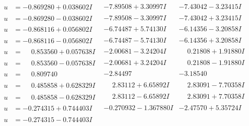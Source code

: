 \documentclass[1p]{elsarticle_modified}
\theoremstyle{definition}
\begin{document}
$$\begin{array}{c|c|c}
 \hline 
\begin{aligned}
u &= -0.869280 + 0.038602 I\end{aligned}
 & -7.89508 + 3.30997 I & -7.43042 - 3.23415 I \\ \hline\begin{aligned}
u &= -0.869280 - 0.038602 I\end{aligned}
 & -7.89508 - 3.30997 I & -7.43042 + 3.23415 I \\ \hline\begin{aligned}
u &= -0.868116 + 0.056802 I\end{aligned}
 & -6.74487 + 5.74130 I & -6.14356 - 3.20858 I \\ \hline\begin{aligned}
u &= -0.868116 - 0.056802 I\end{aligned}
 & -6.74487 - 5.74130 I & -6.14356 + 3.20858 I \\ \hline\begin{aligned}
u &= \phantom{-}0.853560 + 0.057638 I\end{aligned}
 & -2.00681 - 3.24204 I & \phantom{-}0.21808 + 1.91880 I \\ \hline\begin{aligned}
u &= \phantom{-}0.853560 - 0.057638 I\end{aligned}
 & -2.00681 + 3.24204 I & \phantom{-}0.21808 - 1.91880 I \\ \hline\begin{aligned}
u &= \phantom{-}0.809740\phantom{ +0.000000I}\end{aligned}
 & -2.84497\phantom{ +0.000000I} & -3.18540\phantom{ +0.000000I} \\ \hline\begin{aligned}
u &= \phantom{-}0.485858 + 0.628329 I\end{aligned}
 & \phantom{-}2.83112 + 6.65892 I & \phantom{-}2.83091 - 7.70358 I \\ \hline\begin{aligned}
u &= \phantom{-}0.485858 - 0.628329 I\end{aligned}
 & \phantom{-}2.83112 - 6.65892 I & \phantom{-}2.83091 + 7.70358 I \\ \hline\begin{aligned}
u &= -0.274315 + 0.744403 I\end{aligned}
 & -0.270932 - 1.367880 I & -2.47570 + 5.35724 I \\ \hline\begin{aligned}
u &= -0.274315 - 0.744403 I\end{aligned}

\end{array}$$
\end{document}
